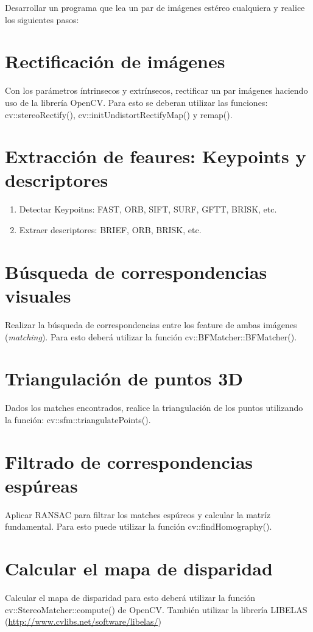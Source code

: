 \documentclass[tp]{lcc}
\begin{document}
Desarrollar un programa que lea un par de imágenes estéreo cualquiera y realice los siguientes pasos:

\section{Rectificación de imágenes}
Con los parámetros íntrinsecos y extrínsecos, rectificar un par imágenes haciendo uso de la librería OpenCV. Para esto se deberan utilizar las funciones: cv::stereoRectify(), cv::initUndistortRectifyMap() y remap().

\section{Extracción de feaures: Keypoints y descriptores}

\begin{enumerate}
	\item Detectar Keypoitns: FAST, ORB, SIFT, SURF, GFTT, BRISK, etc.
	\item Extraer descriptores: BRIEF, ORB, BRISK, etc.
\end{enumerate}

\section{Búsqueda de correspondencias visuales}
Realizar la búsqueda de correspondencias entre los feature de ambas imágenes (\emph{matching}). Para esto deberá utilizar la función cv::BFMatcher::BFMatcher(). 

\section{Triangulación de puntos 3D}
Dados los matches encontrados, realice la triangulación de los puntos utilizando la función: cv::sfm::triangulatePoints().

\section{Filtrado de correspondencias espúreas}
Aplicar RANSAC para filtrar los matches espúreos y calcular la matríz fundamental. Para esto puede utilizar la función cv::findHomography().

\section{Calcular el mapa de disparidad}
Calcular el mapa de disparidad para esto  deberá utilizar la función cv::StereoMatcher::compute() de OpenCV. También utilizar la librería LIBELAS (\href{http://www.cvlibs.net/software/libelas/}{http://www.cvlibs.net/software/libelas/})
\end{document}
